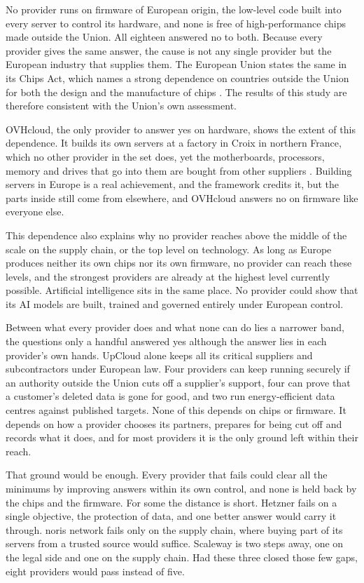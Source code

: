 No provider runs on firmware of European origin, the low-level code built into
every server to control its hardware, and none is free of high-performance chips
made outside the Union. All eighteen answered no to both. Because every provider
gives the same answer, the cause is not any single provider but the European
industry that supplies them. The European Union states the same in its Chips Act,
which names a strong dependence on countries outside the Union for both the
design and the manufacture of chips \cite{EU_ChipsAct_2023}. The results of this
study are therefore consistent with the Union's own assessment.

OVHcloud, the only provider to answer yes on hardware, shows the extent of this
dependence. It builds its own servers at a factory in Croix in northern France, which no
other provider in the set does, yet the motherboards, processors, memory and
drives that go into them are bought from other suppliers
\cite{NextInk_OVHCroix_2023}. Building servers in Europe is a real achievement,
and the framework credits it, but the parts inside still come from elsewhere, and
OVHcloud answers no on firmware like everyone else.

This dependence also explains why no provider reaches above the middle of the
scale on the supply chain, or the top level on technology. As long as Europe
produces neither its own chips nor its own firmware, no provider can reach these
levels, and the strongest providers are already at the highest level currently
possible.
Artificial intelligence sits in the same place. No provider could show that its
\acs{AI} models are built, trained and governed entirely under European control.

Between what every provider does and what none can do lies a narrower band, the
questions only a handful answered yes although the answer lies in each provider's
own hands. UpCloud alone keeps all its critical suppliers and subcontractors under
European law. Four providers can keep running securely if an authority outside the
Union cuts off a supplier's support, four can prove that a customer's deleted data
is gone for good, and two run energy-efficient data centres against published
targets. None of this depends on chips or firmware. It depends on how a provider
chooses its partners, prepares for being cut off and records what it does, and for
most providers it is the only ground left within their reach.

That ground would be enough. Every provider that fails could clear all the
minimums by improving answers within its own control, and none is held back by
the chips and the firmware. For some the distance is short. Hetzner fails on a
single objective, the protection of data, and one better answer would carry it
through. noris network fails only on the supply chain, where buying part of its
servers from a trusted source would suffice. Scaleway is two steps away, one on
the legal side and one on the supply chain. Had these three closed those few gaps,
eight providers would pass instead of five.

